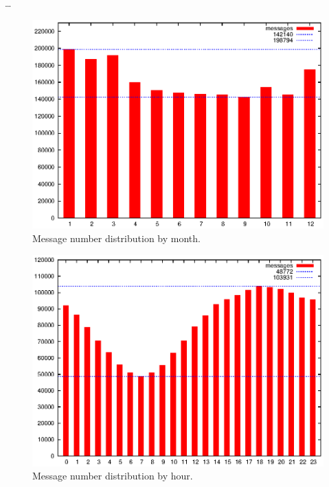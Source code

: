     \ldots
    
    \begin{figure}[H]
      \includegraphics[width=\textwidth]{chapters/03_implementation/monthly}
      \caption{Message number distribution by month.}
      \label{fig:dist_month}
    \end{figure}
    
    \begin{figure}[H]
      \includegraphics[width=\textwidth]{chapters/03_implementation/hourly}
      \caption{Message number distribution by hour.}
      \label{fig:dist_hour}
    \end{figure}